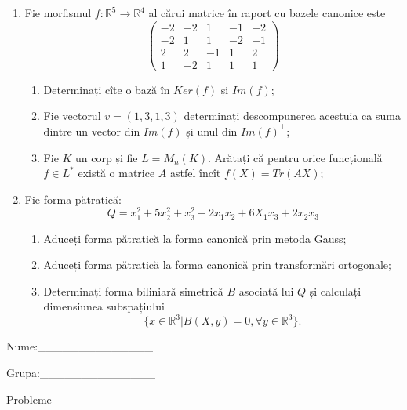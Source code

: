 \documentclass{article}
\begin{document}
\begin{enumerate}
 \item Fie morfismul $f:\mathbb{R}^5 \to \mathbb{R}^4$ al cărui matrice în raport cu bazele canonice este
$$\begin{pmatrix}
-2&-2&1&-1&-2\\
-2&1&1&-2&-1\\
2&2&-1&1&2\\
1&-2&1&1&1
\end{pmatrix}$$

\begin{enumerate}
\item Determinați cîte o bază în $Ker(f)$ și $Im(f)$;
\item Fie vectorul $v=(1,3,1,3)$ determinați descompunerea acestuia ca suma dintre un vector din $Im(f)$ și unul din $Im(f)^\perp$;
\item Fie $K$ un corp și fie $L=M_n(K)$. Arătați că pentru orice funcțională $f \in L^*$ există o matrice $A$ astfel încît $f(X)=Tr(AX)$;
\end{enumerate}
\item Fie forma pătratică:
$$Q= x_1^2+5x_2^2+x_3^2+2x_1x_2+6X_1x_3+2x_2x_3$$

\begin{enumerate}
\item Aduceți forma pătratică la forma canonică prin metoda Gauss;
\item Aduceți forma pătratică la forma canonică prin transformări ortogonale;
\item Determinați forma biliniară simetrică $B$ asociată lui $Q$ și calculați dimensiunea subspațiului
$$\{x \in \mathbb{R}^3 | B(X,y)=0,\forall y \in \mathbb{R}^3\}.$$

\end{enumerate}
\end{enumerate}
\newpage
\begin{flushright}
Nume:\_\_\_\_\_\_\_\_\_\_\_\_\_\_
 
 
Grupa:\_\_\_\_\_\_\_\_\_\_\_\_\_\_
\end{flushright}
\begin{center}
\vspace{2cm}
{\Large Probleme}
\vspace{2cm}
\end{center}
\end{document}
